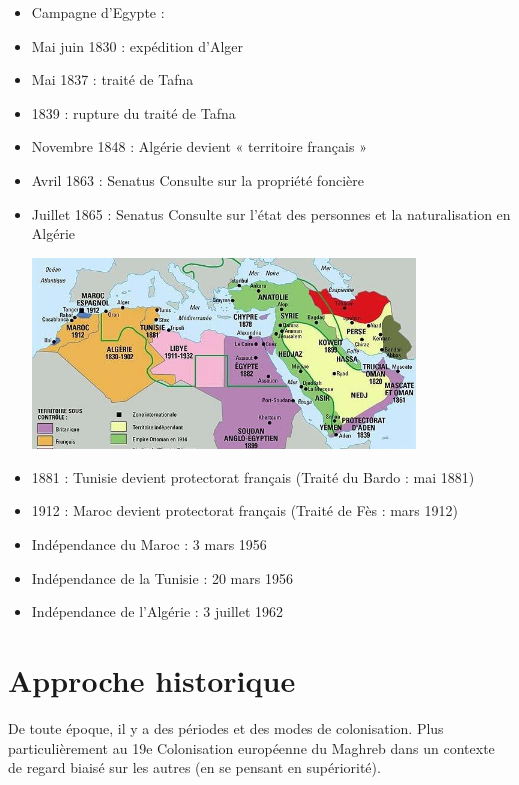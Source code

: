 \begin{itemize}

\item Campagne d'Egypte : 
    \item 
 
Mai
juin 1830 : expédition d’Alger


 
    \item 
Mai 1837 : traité de Tafna
    \item 
1839 : rupture du traité de Tafna
    \item 
Novembre 1848 : Algérie devient «
territoire français »
    \item 
Avril 1863 :
Senatus Consulte sur la propriété foncière
    \item 
Juillet 1865 :
Senatus Consulte sur l’état des personnes et la naturalisation
en Algérie

\includegraphics[width=0.8\textwidth]{HistoireIslamMediterranee/Images/Colonie.jpg}
    \item 
1881 : Tunisie devient protectorat français (Traité du Bardo : mai 1881)
    \item 
1912 : Maroc devient protectorat français (Traité de Fès : mars 1912)

\item Indépendance du Maroc : 3 mars 1956
\item
Indépendance de la Tunisie : 20 mars 1956
\item
Indépendance de l’Algérie : 3 juillet 1962
\end{itemize}



\section{Approche historique}
De toute époque, il y a des périodes et des modes de colonisation.
Plus particulièrement au 19e 
Colonisation européenne du Maghreb dans un contexte de regard biaisé sur les autres (en se pensant en supériorité).
